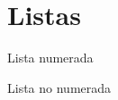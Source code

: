 \section{Listas}

\begin{frame}[fragile]
	\begin{block}{Lista numerada}\end{block} %
	\pause
	\begin{block}{Lista no numerada}\end{block} %
\end{frame}
